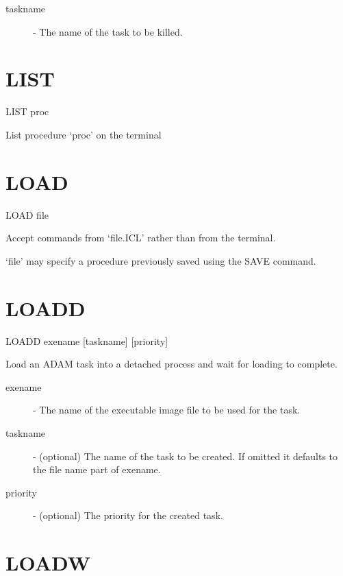 \documentclass[twoside,11pt]{report}
\newcommand{\xlabel}[1]{}
\begin{document}
\begin{description}

\item[taskname] -  The name of the task to be killed.

\end{description}

\section{\xlabel{LIST}LIST\label{LIST}}

    LIST \hspace{.5cm} proc

 List procedure `proc' on the terminal

\section{\xlabel{LOAD}LOAD\label{LOAD}}

    LOAD  file

 Accept commands from `file.ICL' rather than from the terminal.

 `file' may specify a procedure previously saved using the SAVE command.

\section{\xlabel{LOADD}LOADD\label{LOADD}}


    LOADD \hspace{.5cm} exename \hspace{.5cm} [taskname] \hspace{.5cm} [priority]

    Load an ADAM task into a detached process and wait for
    loading to complete.
\begin{description}

\item[exename] - The name of the executable image file to
            be used for the task.

\item[taskname] - (optional) The name of the task to be created.
            If omitted it defaults to the file name part of
            exename.

\item[priority] - (optional) The priority for the created task.

\end{description}

\section{\xlabel{LOADW}LOADW\label{LOADW}}
\end{document}
